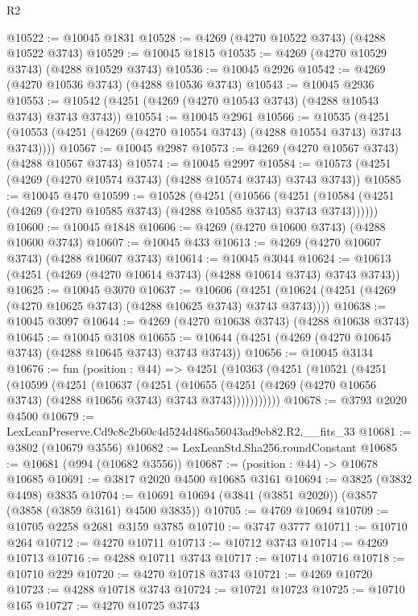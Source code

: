 \begin{lexlean}{R2}
\begin{coremodule}
@10522 := @10045 @1831
@10528 := @4269 (@4270 @10522 @3743) (@4288 @10522 @3743)
@10529 := @10045 @1815
@10535 := @4269 (@4270 @10529 @3743) (@4288 @10529 @3743)
@10536 := @10045 @2926
@10542 := @4269 (@4270 @10536 @3743) (@4288 @10536 @3743)
@10543 := @10045 @2936
@10553 := @10542 (@4251 (@4269 (@4270 @10543 @3743) (@4288 @10543 @3743) @3743 @3743))
@10554 := @10045 @2961
@10566 := @10535
    (@4251 (@10553 (@4251 (@4269 (@4270 @10554 @3743) (@4288 @10554 @3743) @3743 @3743))))
@10567 := @10045 @2987
@10573 := @4269 (@4270 @10567 @3743) (@4288 @10567 @3743)
@10574 := @10045 @2997
@10584 := @10573 (@4251 (@4269 (@4270 @10574 @3743) (@4288 @10574 @3743) @3743 @3743))
@10585 := @10045 @470
@10599 := @10528
    (@4251
      (@10566
        (@4251 (@10584 (@4251 (@4269 (@4270 @10585 @3743) (@4288 @10585 @3743) @3743 @3743))))))
@10600 := @10045 @1848
@10606 := @4269 (@4270 @10600 @3743) (@4288 @10600 @3743)
@10607 := @10045 @433
@10613 := @4269 (@4270 @10607 @3743) (@4288 @10607 @3743)
@10614 := @10045 @3044
@10624 := @10613 (@4251 (@4269 (@4270 @10614 @3743) (@4288 @10614 @3743) @3743 @3743))
@10625 := @10045 @3070
@10637 := @10606
    (@4251 (@10624 (@4251 (@4269 (@4270 @10625 @3743) (@4288 @10625 @3743) @3743 @3743))))
@10638 := @10045 @3097
@10644 := @4269 (@4270 @10638 @3743) (@4288 @10638 @3743)
@10645 := @10045 @3108
@10655 := @10644 (@4251 (@4269 (@4270 @10645 @3743) (@4288 @10645 @3743) @3743 @3743))
@10656 := @10045 @3134
@10676 := fun (position : @44) =>
  @4251
    (@10363
      (@4251
        (@10521
          (@4251
            (@10599
              (@4251
                (@10637
                  (@4251
                    (@10655
                      (@4251 (@4269 (@4270 @10656 @3743) (@4288 @10656 @3743) @3743 @3743)))))))))))
@10678 := @3793 @2020 @4500
@10679 := LexLeanPreserve.Cd9c8c2b60c4d524d486a56043ad9eb82.R2.__fits_33
@10681 := @3802 (@10679 @3556)
@10682 := LexLeanStd.Sha256.roundConstant
@10685 := @10681 (@994 (@10682 @3556))
@10687 := (position : @44) -> @10678 @10685
@10691 := @3817 @2020 @4500 @10685 @3161
@10694 := @3825 (@3832 @4498) @3835
@10704 := @10691 @10694 (@3841 (@3851 @2020)) (@3857 (@3858 (@3859 @3161) @4500 @3835))
@10705 := @4769 @10694
@10709 := @10705 @2258 @2681 @3159 @3785
@10710 := @3747 @3777
@10711 := @10710 @264
@10712 := @4270 @10711
@10713 := @10712 @3743
@10714 := @4269 @10713
@10716 := @4288 @10711 @3743
@10717 := @10714 @10716
@10718 := @10710 @229
@10720 := @4270 @10718 @3743
@10721 := @4269 @10720
@10723 := @4288 @10718 @3743
@10724 := @10721 @10723
@10725 := @10710 @165
@10727 := @4270 @10725 @3743

\end{coremodule}
\end{lexlean}
